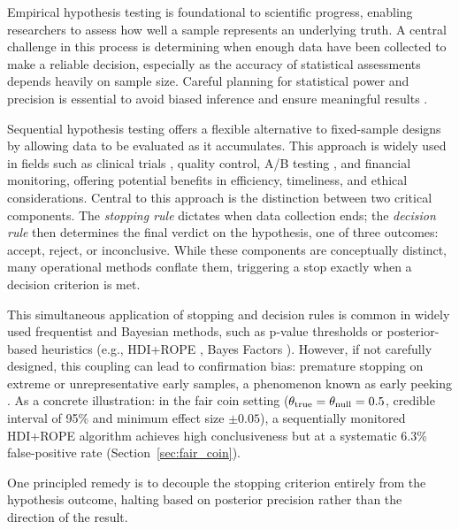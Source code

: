 
Empirical hypothesis testing is foundational to scientific progress, enabling researchers
to assess how well a sample represents an underlying truth.
A central challenge in this process is determining when enough data have been collected
to make a reliable decision, especially as the accuracy of statistical assessments
depends heavily on sample size.  Careful planning for statistical power and precision
is essential to avoid biased inference and ensure meaningful results \citep{cohen1988}.

Sequential hypothesis testing offers a flexible alternative to fixed-sample designs
\citep{wald1947} by allowing data to be evaluated as it accumulates.
This approach is widely used in fields such as clinical trials
\citep{jennison2000, fda2010bayesian}, quality control, A/B testing \citep{johari2022}, and financial
monitoring,
offering potential benefits in efficiency, timeliness, and ethical considerations.
Central to this approach is the distinction between two critical components.
The \textit{stopping rule} dictates when data collection ends; the
\textit{decision rule} then determines the final verdict on the hypothesis,
one of three outcomes: accept, reject, or inconclusive.
While these components are conceptually distinct, many operational methods
conflate them, triggering a stop exactly when a decision criterion is met.

This simultaneous application of stopping and decision rules is common in widely used
frequentist and Bayesian methods, such as p-value thresholds \citep{fisher1925} or posterior-based heuristics
(e.g., HDI+ROPE \citealp{kruschke2011, kruschke2013, kruschke2015doing},
Bayes Factors \citealp{kassraftery1995}).
However, if not carefully designed, this coupling can lead to confirmation bias:
premature stopping on extreme or unrepresentative early samples, a phenomenon known
as early peeking \citep{simmons2011}.
As a concrete illustration: in the fair coin setting
($\theta_{\rm true}=\theta_{\rm null}=0.5$, credible interval of 95\% and minimum effect size $\pm 0.05$),
a sequentially monitored HDI+ROPE algorithm achieves high conclusiveness
but at a systematic 6.3\% false-positive rate (Section~\ref{sec:fair_coin}).

One principled remedy is to decouple the stopping criterion entirely from the hypothesis
outcome, halting based on posterior precision rather than the direction of the result.

